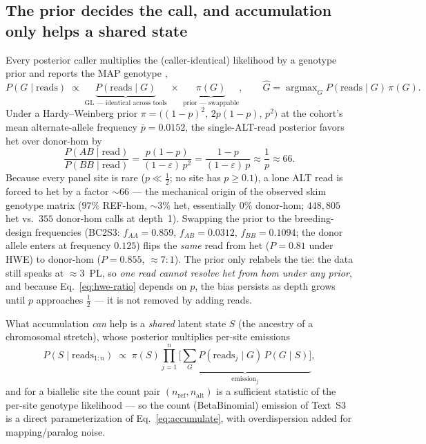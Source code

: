\documentclass[11pt]{article}
\DeclareMathOperator*{\argmax}{argmax}
\begin{document}
\subsection{The prior decides the call, and accumulation only helps a shared state}
\label{sec:prior}

Every posterior caller multiplies the (caller-identical) likelihood by a
genotype prior and reports the MAP genotype \citep{nielsen_2011,korneliussen_angsd_2014},
\begin{equation}
P(G\mid\text{reads}) \;\propto\;
\underbrace{P(\text{reads}\mid G)}_{\text{GL --- identical across tools}}
\;\times\;
\underbrace{\pi(G)}_{\text{prior --- swappable}},
\qquad
\hat G=\argmax_G P(\text{reads}\mid G)\,\pi(G).
\label{eq:posterior}
\end{equation}
Under a Hardy--Weinberg prior $\pi=\big((1-p)^2,\,2p(1-p),\,p^2\big)$ at the
cohort's mean alternate-allele frequency $\bar p=0.0152$, the single-ALT-read
posterior favors het over donor-hom by
\begin{equation}
\frac{P(AB\mid\text{read})}{P(BB\mid\text{read})}
=\frac{p(1-p)}{(1-\varepsilon)\,p^{2}}
=\frac{1-p}{(1-\varepsilon)\,p}\approx\frac{1}{p}\approx 66 .
\label{eq:hwe-ratio}
\end{equation}
Because every panel site is rare ($p\ll\tfrac12$; no site has $p\ge0.1$), a lone
ALT read is forced to het by a factor ${\sim}66$ --- the mechanical origin of the
observed skim genotype matrix ($97\%$ REF-hom, $\sim3\%$ het, essentially $0\%$
donor-hom; $448{,}805$ het vs.\ $355$ donor-hom calls at depth~1). Swapping the
prior to the breeding-design frequencies (BC2S3: $f_{AA}=0.859$, $f_{AB}=0.0312$,
$f_{BB}=0.1094$; the donor allele enters at frequency $0.125$) flips the \emph{same}
read from het ($P=0.81$ under HWE) to donor-hom ($P=0.855$, $\approx 7{:}1$). The
prior only relabels the tie: the data still speaks at $\approx 3$~PL, so \emph{one
read cannot resolve het from hom under any prior}, and because
Eq.~\eqref{eq:hwe-ratio} depends on $p$, the bias persists as depth grows until $p$
approaches $\tfrac12$ --- it is not removed by adding reads.

What accumulation \emph{can} help is a \emph{shared} latent state $S$ (the ancestry
of a chromosomal stretch), whose posterior multiplies per-site emissions
\begin{equation}
P(S\mid\text{reads}_{1:n}) \;\propto\; \pi(S)\prod_{j=1}^{n}
\underbrace{\Big[\textstyle\sum_{G} P(\text{reads}_j\mid G)\,P(G\mid S)\Big]}_{\text{emission}_j},
\label{eq:accumulate}
\end{equation}
and for a biallelic site the count pair $(n_{\mathrm{ref}},n_{\mathrm{alt}})$ is a
sufficient statistic of the per-site genotype likelihood --- so the count
(BetaBinomial) emission of Text~S3 is a direct parameterization of
Eq.~\eqref{eq:accumulate}, with overdispersion added for mapping/paralog noise.
\end{document}
